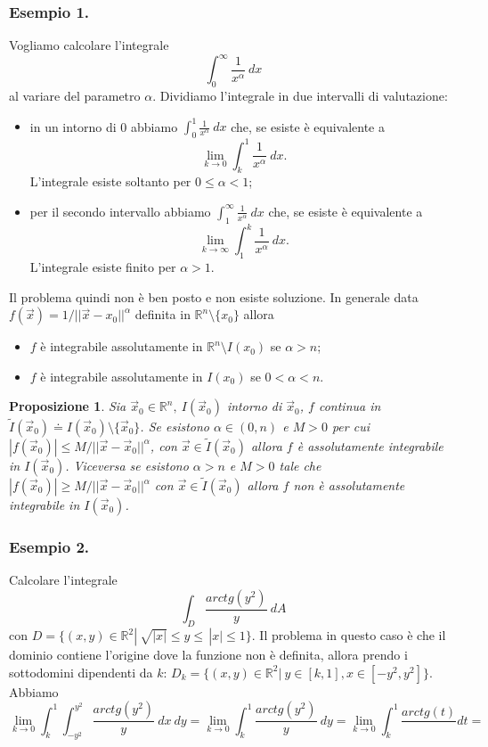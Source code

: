 \documentclass[10pt]{article}
\theoremstyle{plain}
\newtheorem{prop}[thm]{Proposizione}
\theoremstyle{definition}
\begin{document}
\subsubsection{Esempio 1.}
Vogliamo calcolare l'integrale 
$$\int_0^\infty \frac{1}{x^\alpha}\ dx
$$
al variare del parametro $\alpha$. Dividiamo l'integrale in due intervalli di valutazione:
\begin{itemize}
    \item in un intorno di 0 abbiamo 
    $\int_0^1 \frac{1}{x^\alpha}\ dx$ che, se esiste è equivalente a
    $$\lim_{k\to 0}\int_k^1 \frac{1}{x^\alpha}\ dx.$$ L'integrale esiste soltanto per $0\leq \alpha <1$;
    \item per il secondo intervallo abbiamo 
    $\int_1^\infty \frac{1}{x^\alpha}\ dx$ che, se esiste è equivalente a
    $$\lim_{k\to \infty}\int_1^k \frac{1}{x^\alpha}\ dx.$$ L'integrale esiste finito per $ \alpha >1$.
\end{itemize}
Il problema quindi non è ben posto e non esiste soluzione.
In generale data $f(\vec{x})=1/||\vec{x}-x_0||^\alpha$ definita in $\mathbb{R}^n\setminus \{x_0 \}$ allora 
\begin{itemize}

    \item $f$ è integrabile assolutamente in $\mathbb{R}^n\setminus I(x_0)$ se $\alpha > n$;
    \item $f$ è integrabile assolutamente in $I(x_0)$ se $0 <\alpha < n$.
\end{itemize}
\begin{prop}
Sia $\vec{x}_0 \in \mathbb{R}^n,\  I(\vec{x}_0 )$ intorno di $\vec{x}_0 $, $f$ continua in $\widetilde{I}(\vec{x}_0 )\doteq I(\vec{x}_0 )\setminus \{ \vec{x}_0 \} $. Se esistono $\alpha \in (0,n)$ e $M>0 $ per cui $|f(\vec{x}_0)|\leq M/||\vec{x}-\vec{x}_0||^\alpha$, con $\vec{x}\in \widetilde{I}(\vec{x}_0 )$ allora $f$ è assolutamente integrabile in $I(\vec{x}_0 )$. Viceversa se esistono $\alpha>n $ e $M>0$ tale che  $|f(\vec{x}_0)|\geq M/||\vec{x}-\vec{x}_0||^\alpha$ con $\vec{x}\in \widetilde{I}(\vec{x}_0 )$ allora $f$ non è assolutamente integrabile in $I(\vec{x}_0 )$.
\end{prop}

\subsubsection{Esempio 2.}
Calcolare l'integrale 
$$\int_D\frac{arctg(y^2)}{y}\ dA$$ con $D=\{ (x,y)\in \mathbb{R}^2|\ \sqrt{|x|}\leq y \leq \, |x|\leq 1 \}$.
Il problema in questo caso è che il dominio contiene l'origine dove la funzione non è definita, allora prendo i sottodomini dipendenti da $k$: $D_k=\{ (x,y)\in \mathbb{R}^2|\ y\in [k,1], x\in [-y^2,y^2] \}$. 
Abbiamo 
$$\lim_{k\to 0} \int_k^1 \int_{-y^2}^{y^2} \frac{arctg(y^2)}{y}\ dx\ dy=
\lim_{k\to 0} \int_k^1 \frac{arctg(y^2)}{y}\ dy = \lim_{k\to 0} \int_k^1 \frac{arctg(t)}\ dt = 
$$
\end{document}
